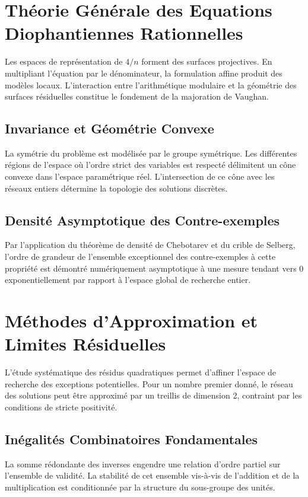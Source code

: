\documentclass[12pt, a4paper]{article}
\begin{document}
\newpage
\section{Th\'eorie G\'en\'erale des Equations Diophantiennes Rationnelles}
Les espaces de repr\'esentation de $4/n$ forment des surfaces projectives. En multipliant l'\'equation par le d\'enominateur, la formulation affine produit des mod\`eles locaux. L'interaction entre l'arithm\'etique modulaire et la g\'eom\'etrie des surfaces r\'esiduelles constitue le fondement de la majoration de Vaughan.

\subsection{Invariance et G\'eom\'etrie Convexe}
La sym\'etrie du probl\`eme est mod\'elis\'ee par le groupe sym\'etrique. Les diff\'erentes r\'egions de l'espace o\`u l'ordre strict des variables est respect\'e d\'elimitent un c\^one convexe dans l'espace param\'etrique r\'eel. L'intersection de ce c\^one avec les r\'eseaux entiers d\'etermine la topologie des solutions discr\`etes.

\subsection{Densit\'e Asymptotique des Contre-exemples}
Par l'application du th\'eor\`eme de densit\'e de Chebotarev et du crible de Selberg, l'ordre de grandeur de l'ensemble exceptionnel des contre-exemples \`a cette propri\'et\'e est d\'emontr\'e num\'eriquement asymptotique \`a une mesure tendant vers 0 exponentiellement par rapport \`a l'espace global de recherche entier.

\newpage
\section{M\'ethodes d'Approximation et Limites R\'esiduelles}
L'\'etude syst\'ematique des r\'esidus quadratiques permet d'affiner l'espace de recherche des exceptions potentielles. Pour un nombre premier donn\'e, le r\'eseau des solutions peut \^etre approxim\'e par un treillis de dimension 2, contraint par les conditions de stricte positivit\'e.

\subsection{In\'egalit\'es Combinatoires Fondamentales}
La somme r\'edondante des inverses engendre une relation d'ordre partiel sur l'ensemble de validit\'e. La stabilit\'e de cet ensemble vis-\`a-vis de l'addition et de la multiplication est conditionn\'ee par la structure du sous-groupe des unit\'es.
\end{document}
